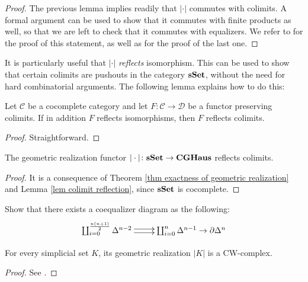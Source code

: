 \begin{refsection}
\begin{proof}
The previous lemma implies readily that $| \cdot |$ commutes with colimits. A formal argument can be used to show that it commutes with finite products as well, so that we are left to check that it commutes with equalizers. We refer to \cite[Ch. III.3]{gz} for the proof of this statement, as well as for the proof of the last one.
\end{proof}

It is particularly useful that $| \cdot |$ \emph{reflects} isomorphism. This can be used to show that certain colimits are pushouts in the category $\mathbf{sSet}$, without the need for hard combinatorial arguments. The following lemma explains how to do this:

\begin{lemma} \label{lem colimit reflection}
Let $\mathcal C$ be a cocomplete category and let $F \colon \mathcal C \to \mathcal D$ be a functor preserving colimits. If in addition $F$ reflects isomorphisms, then $F$ reflects colimits.
\end{lemma}

\begin{proof}
Straightforward.
\end{proof}

\begin{cor} \label{cor colimit in sset}
The geometric realization functor $| \cdot | \colon \mathbf{sSet} \to \mathbf{CGHaus}$ reflects colimits.
\end{cor}

\begin{proof}
It is a consequence of Theorem \ref{thm exactness of geometric realization} and Lemma \ref{lem colimit reflection}, since $\mathbf{sSet}$ is cocomplete.
\end{proof}

\begin{exercise}
Show that there exists a coequalizer diagram as the following:
\[
\xymatrix{
\coprod_{i = 0}^{\frac{n(n+1)}{2}} \Delta^{n-2} \ar@<.5ex>[r] \ar@<-.5ex>[r] & \coprod_{i = 0}^{n} \Delta^{n-1} \to \partial \Delta^n
}
\]
\end{exercise}

\begin{cor}
For every simplicial set $K$, its geometric realization $|K|$ is a CW-complex.
\end{cor}

\begin{proof}
See \cite[Proposition I.2.3]{gj}.
\end{proof}


\end{refsection}

